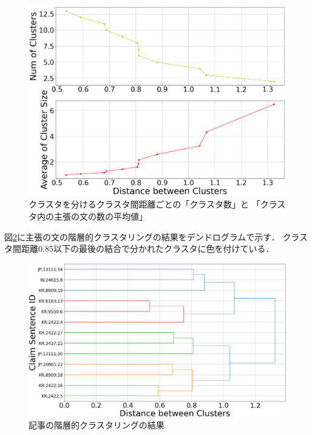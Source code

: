 \documentclass[12pt,a4j]{jreport}
\begin{document}
\begin{figure}[H]
	\centering
	\includegraphics[keepaspectratio, width=120mm]{img/process-07_sentences-cluster_from-cluster-230_with-threshold-85_threshold-dependencies_reduced-data-to-5000_Trim.png}
	\caption{クラスタを分けるクラスタ間距離ごとの「クラスタ数」と
  「クラスタ内の主張の文の数の平均値」}
	\label{num_and_size_of_clusters_of_sentences}
\end{figure}

図\ref{sentences_dendrogram}に主張の文の階層的クラスタリングの結果をデンドログラムで示す．
クラスタ間距離0.85以下の最後の結合で分かれたクラスタに色を付けている．

\begin{figure}[H]
	\centering
	\includegraphics[keepaspectratio, width=120mm]{img/process-07_sentences-cluster_from-cluster-230_with-threshold-85_color_dendrogram_reduced-data-to-5000_y-120_Trim.png}
	\caption{記事の階層的クラスタリングの結果}
	\label{sentences_dendrogram}
\end{figure}
\end{document}
